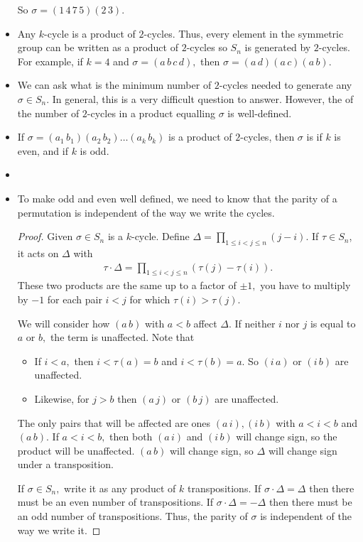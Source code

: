 \documentclass[a4paper]{article}
\begin{document}
\begin{itemize}
    So $\sigma=(1\,4\,7\,5)(2\,3).$
    \item Any $k$-cycle is a product of $2$-cycles. Thus, every element in the symmetric group can be written as a product of $2$-cycles so $S_n$ is generated by $2$-cycles. For example, if $k=4$ and $\sigma=(a\,b\,c\,d),$ then $\sigma=(a\,d)(a\,c)(a\,b).$
    \item We can ask what is the minimum number of $2$-cycles needed to generate any $\sigma\in S_n.$ In general, this is a very difficult question to answer. However, the  of the number of $2$-cycles in a product equalling $\sigma$ is well-defined.
    \item If $\sigma=(a_1\,b_1)(a_2\,b_2)\dots(a_k\,b_k)$ is a product of $2$-cycles, then $\sigma$ is  if $k$ is even, and  if $k$ is odd.
    \item {}
    \item To make odd and even well defined, we need to know that the parity of a permutation is independent of the way we write the cycles.
    \begin{proof}
        Given $\sigma\in S_n$ is a $k$-cycle. Define $\Delta=\prod_{1\leq i<j\leq n}(j-i).$ If $\tau\in S_n$, it acts on $\Delta$ with \begin{align}
            \tau\cdot\Delta=\prod_{1\leq i<j\leq n}(\tau(j)-\tau(i)).
        \end{align}
        These two products are the same up to a factor of $\pm1,$ you have to multiply by $-1$ for each pair $i<j$ for which $\tau(i)>\tau(j).$
        
        We will consider how $(a\,b)$ with $a<b$ affect $\Delta.$ If neither $i$ nor $j$ is equal to $a$ or $b,$ the term is unaffected. Note that \begin{itemize}
            \item If $i<a,$ then $i<\tau(a)=b$ and $i<\tau(b)=a.$ So $(i\,a)$ or $(i\,b)$ are unaffected.
            \item Likewise, for $j>b$ then $(a\,j)$ or $(b\,j)$ are unaffected.
        \end{itemize}
        The only pairs that will be affected are ones $(a\,i),(i\,b)$ with $a<i<b$ and $(a\,b).$ If $a<i<b,$ then both $(a\,i)$ and $(i\,b)$ will change sign, so the product will be unaffected. $(a\,b)$ will change sign, so $\Delta$ will change sign under a transposition.

        If $\sigma\in S_n,$ write it as any product of $k$ transpositions. If $\sigma\cdot\Delta=\Delta$ then there must be an even number of transpositions. If $\sigma\cdot\Delta=-\Delta$ then there must be an odd number of transpositions. Thus, the parity of $\sigma$ is independent of the way we write it.
    \end{proof}
\end{itemize}
\end{document}
